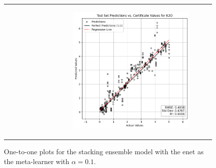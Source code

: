 \begin{figure}
{\begin{tabular}{cc}
\begin{subfigure}{0.5\textwidth}
            \end{subfigure} & \hspace{3cm}
            \begin{subfigure}{0.5\textwidth}
                \includegraphics[width=\textwidth]{images/one_to_one/enetalpha01/K2O.png}
            \end{subfigure}
        \end{tabular}
    }
    \caption{One-to-one plots for the stacking ensemble model with the \gls{enet} as the meta-learner with $\alpha = 0.1$.}
    \label{fig:enetalpha01_one_to_one}
\end{figure}

